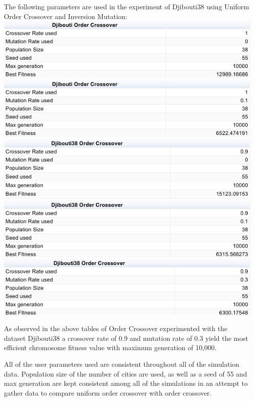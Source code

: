 \documentclass[conference]{IEEEtran}
\begin{document}
The following parameters are used in the experiment of Djibouti38 using Uniform Order Crossover and Inversion Mutation:
\includegraphics[scale=0.42]{Djibouti38/OC/Djibouti38_OC_a)_table}
\includegraphics[scale=0.42]{Djibouti38/OC/Djibouti38_OC_b)_table}
\includegraphics[scale=0.42]{Djibouti38/OC/Djibouti38_OC_c)_table}
\includegraphics[scale=0.42]{Djibouti38/OC/Djibouti38_OC_d)_table}
\includegraphics[scale=0.42]{Djibouti38/OC/Djibouti38_OC_e)_table}

As observed in the above tables of Order Crossover experimented with the dataset Djibouti38 a crossover rate of 0.9 and mutation rate of 0.3 yield the most efficient chromosome fitness value with maximum generation of 10,000.

All of the user parameters used are consistent throughout all of the simulation data. Population size of the number of cities are used, as well as a seed of 55 and max generation are kept consistent among all of the simulations in an attempt to gather data to compare uniform order crossover with order crossover.
\end{document}
